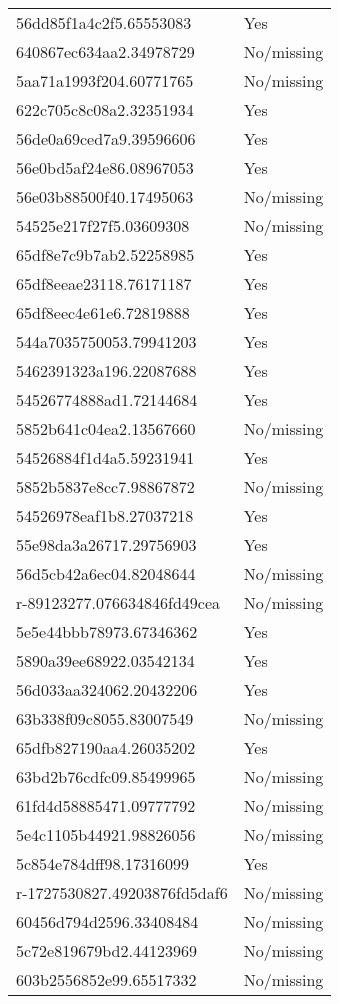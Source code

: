 \begin{tabular}{ll}
56dd85f1a4c2f5.65553083 & Yes \\
640867ec634aa2.34978729 & No/missing \\
5aa71a1993f204.60771765 & No/missing \\
622c705c8c08a2.32351934 & Yes \\
56de0a69ced7a9.39596606 & Yes \\
56e0bd5af24e86.08967053 & Yes \\
56e03b88500f40.17495063 & No/missing \\
54525e217f27f5.03609308 & No/missing \\
65df8e7c9b7ab2.52258985 & Yes \\
65df8eeae23118.76171187 & Yes \\
65df8eec4e61e6.72819888 & Yes \\
544a7035750053.79941203 & Yes \\
5462391323a196.22087688 & Yes \\
54526774888ad1.72144684 & Yes \\
5852b641c04ea2.13567660 & No/missing \\
54526884f1d4a5.59231941 & Yes \\
5852b5837e8cc7.98867872 & No/missing \\
54526978eaf1b8.27037218 & Yes \\
55e98da3a26717.29756903 & Yes \\
56d5cb42a6ec04.82048644 & No/missing \\
r-89123277.076634846fd49cea & No/missing \\
5e5e44bbb78973.67346362 & Yes \\
5890a39ee68922.03542134 & Yes \\
56d033aa324062.20432206 & Yes \\
63b338f09c8055.83007549 & No/missing \\
65dfb827190aa4.26035202 & Yes \\
63bd2b76cdfc09.85499965 & No/missing \\
61fd4d58885471.09777792 & No/missing \\
5e4c1105b44921.98826056 & No/missing \\
5c854e784dff98.17316099 & Yes \\
r-1727530827.49203876fd5daf6 & No/missing \\
60456d794d2596.33408484 & No/missing \\
5c72e819679bd2.44123969 & No/missing \\
603b2556852e99.65517332 & No/missing \\

\end{tabular}

